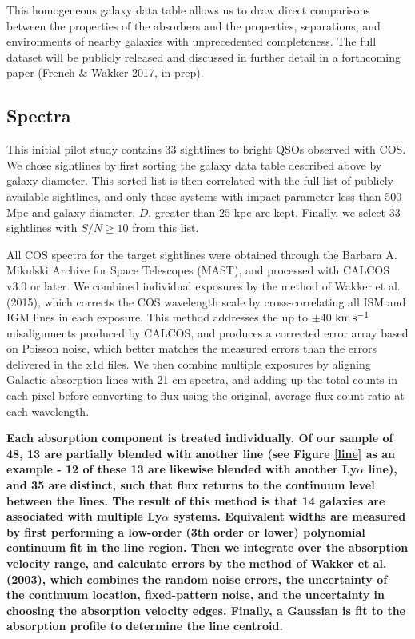 \documentclass[twocolumn,tighten]{aastex6}
\begin{document}
This homogeneous galaxy data table allows us to draw direct comparisons between the properties of the absorbers and the properties, separations, and environments of nearby galaxies with unprecedented completeness. The full dataset will be publicly released and discussed in further detail in a forthcoming paper (French $\&$ Wakker 2017, in prep).


\subsection{Spectra}

This initial pilot study contains 33 sightlines to bright QSOs observed with COS. We chose sightlines by first sorting the galaxy data table described above by galaxy diameter. This sorted list is then correlated with the full list of publicly available sightlines, and only those systems with impact parameter less than 500 Mpc and galaxy diameter, $D$, greater than $25$ kpc  are kept. Finally, we select 33 sightlines with $S/N \geq 10$ from this list.

All COS spectra for the target sightlines were obtained through the Barbara A. Mikulski Archive for Space Telescopes (MAST), and processed with CALCOS v3.0 or later. We combined individual exposures by the method of Wakker et al. (2015), which corrects the COS wavelength scale by cross-correlating all ISM and IGM lines in each exposure. This method addresses the up to $\pm40$ $\rm km\, s^{-1}$ misalignments produced by CALCOS, and produces a corrected error array based on Poisson noise, which better matches the measured errors than the errors delivered in the x1d files. We then combine multiple exposures by aligning Galactic absorption lines with 21-cm spectra, and adding up the total counts in each pixel before converting to flux using the original, average flux-count ratio at each wavelength.

\textbf{Each absorption component is treated individually. Of our sample of 48, 13 are partially blended with another line (see Figure \ref{line} as an example - 12 of these 13 are likewise blended with another Ly$\alpha$ line), and 35 are distinct, such that flux returns to the continuum level between the lines. The result of this method is that 14 galaxies are associated with multiple Ly$\alpha$ systems. Equivalent widths are measured by first performing a low-order (3th order or lower) polynomial continuum fit in the line region. Then we integrate over the absorption velocity range, and calculate errors by the method of Wakker et al. (2003), which combines the random noise errors, the uncertainty of the continuum location, fixed-pattern noise, and the uncertainty in choosing the absorption velocity edges. Finally, a Gaussian is fit to the absorption profile to determine the line centroid.}
\end{document}
